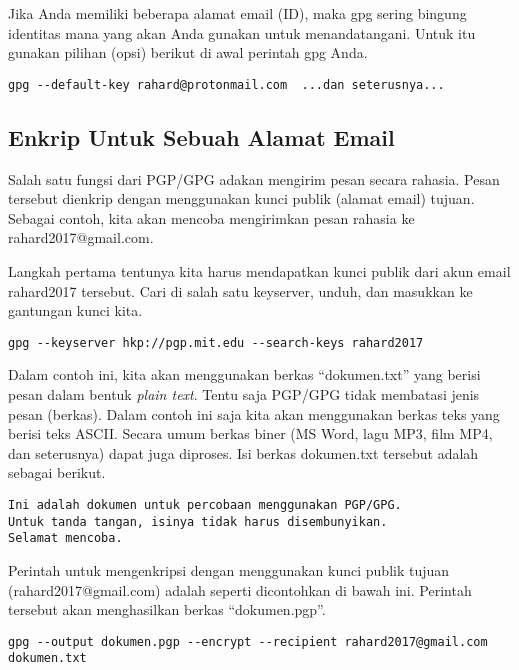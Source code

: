 Jika Anda memiliki beberapa alamat email (ID), maka gpg sering bingung 
identitas mana yang akan Anda gunakan untuk menandatangani. 
Untuk itu gunakan pilihan (opsi) berikut di awal perintah gpg Anda.

\begin{verbatim}
gpg --default-key rahard@protonmail.com  ...dan seterusnya...
\end{verbatim}

\subsection{Enkrip Untuk Sebuah Alamat Email}
Salah satu fungsi dari PGP/GPG adakan mengirim pesan secara rahasia. Pesan
tersebut dienkrip dengan menggunakan kunci publik (alamat email) tujuan.
Sebagai contoh, kita akan mencoba mengirimkan pesan rahasia ke
rahard2017@gmail.com.

Langkah pertama tentunya kita harus mendapatkan kunci publik dari akun email
rahard2017 tersebut. Cari di salah satu keyserver, unduh, dan masukkan ke
gantungan kunci kita.

\begin{verbatim}
gpg --keyserver hkp://pgp.mit.edu --search-keys rahard2017
\end{verbatim}

Dalam contoh ini, kita akan menggunakan berkas ``dokumen.txt'' yang berisi
pesan dalam bentuk {\em plain text}. Tentu saja PGP/GPG tidak membatasi jenis
pesan (berkas). Dalam contoh ini saja kita akan menggunakan berkas teks yang
berisi teks ASCII. Secara umum berkas biner (MS Word, lagu MP3, film MP4, dan
seterusnya) dapat juga diproses. Isi berkas dokumen.txt tersebut adalah sebagai
berikut.

\begin{mdframed}[backgroundcolor=blue!20] 
\begin{verbatim}
Ini adalah dokumen untuk percobaan menggunakan PGP/GPG.
Untuk tanda tangan, isinya tidak harus disembunyikan.
Selamat mencoba.
\end{verbatim}
\end{mdframed}

Perintah untuk mengenkripsi dengan menggunakan kunci publik tujuan
(rahard2017@gmail.com) adalah seperti dicontohkan di bawah ini. Perintah
tersebut akan menghasilkan berkas ``dokumen.pgp''.

\begin{verbatim}
gpg --output dokumen.pgp --encrypt --recipient rahard2017@gmail.com dokumen.txt
\end{verbatim}


